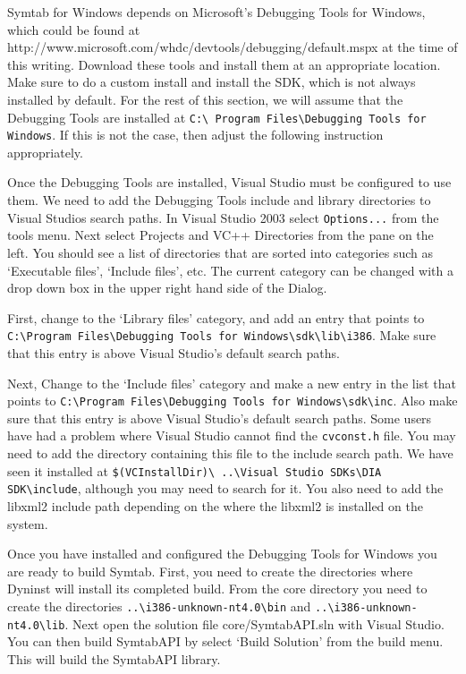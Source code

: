 Symtab for Windows depends on Microsoft's Debugging Tools for Windows, which
could be found at http://www.microsoft.com/whdc/devtools/debugging/default.mspx
at the time of this writing. Download these tools and install them at an
appropriate location. Make sure to do a custom install and install the SDK,
which is not always installed by default. For the rest of this section, we will
assume that the Debugging Tools are installed at \texttt{C:\textbackslash
    Program Files\textbackslash Debugging
Tools for Windows}. If this is not the case, then adjust the following
instruction appropriately.

Once the Debugging Tools are installed, Visual Studio must be configured to use
them. We need to add the Debugging Tools include and library directories to
Visual Studios search paths. In Visual Studio 2003 select \texttt{Options...} from the
tools menu. Next select Projects and VC++ Directories from the pane on the left.
You should see a list of directories that are sorted into categories such as
`Executable files', `Include files', etc. The current category can
be changed with a drop down box in the upper right hand side of the Dialog. 

First, change to the `Library files' category, and add an entry that
points to \\
\texttt{C:\textbackslash Program Files\textbackslash Debugging Tools
for Windows\textbackslash sdk\textbackslash lib\textbackslash i386}. Make sure
that this entry is above Visual Studio's default search paths.

Next, Change to the `Include files' category and make a new entry in the
list that points to \texttt{C:\textbackslash Program Files\textbackslash Debugging Tools for
Windows\textbackslash sdk\textbackslash inc}. Also
make sure that this entry is above Visual Studio's default search paths. Some
users have had a problem where Visual Studio cannot find the \texttt{cvconst.h} file. You
may need to add the directory containing this file to the include search path.
We have seen it installed at \texttt{\$(VCInstallDir)\textbackslash
    ..\textbackslash Visual Studio SDKs\textbackslash DIA
SDK\textbackslash include}, although you may need to search for it. You also need to add the
libxml2 include path depending on the where the libxml2 is installed on the
system.  

Once you have installed and configured the Debugging Tools for Windows
you are ready to build Symtab. First, you need to create the directories where
Dyninst will install its completed build. From the core directory you need to
create the directories \texttt{..\textbackslash i386-unknown-nt4.0\textbackslash bin} and
\texttt{..\textbackslash i386-unknown-nt4.0\textbackslash lib}.
Next open the solution file core/SymtabAPI.sln with Visual Studio.   You can
then build SymtabAPI by select `Build Solution' from the build menu. This
will build the SymtabAPI library.

